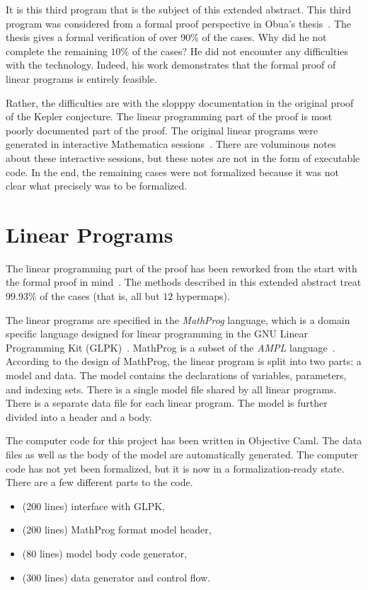 \documentclass{llncs}
\begin{document}
It is this third program
that is the subject of this extended abstract.  This third
program was considered from a formal proof
perspective in Obua's thesis~\cite{obua:phd}.
The thesis gives a formal verification of over 90\% of the cases.
Why did he not complete the remaining $10\%$ of the cases? He did not
encounter any difficulties with the technology.  Indeed, his work demonstrates
that the formal proof of linear programs is entirely feasible.

Rather, the difficulties are with the slopppy documentation in the
original proof of the Kepler conjecture.  The linear programming part
of the proof is most poorly documented part of the proof.  The
original linear programs were generated in interactive Mathematica
sessions~\cite{website:HalesKepler}.  There are voluminous notes about these interactive sessions,
but these notes are not in the form of executable code.  In the end, the remaining cases were not formalized because it was not clear what precisely was to be formalized.


\section{Linear Programs}

The linear programming part of the proof has been reworked from the
start with the formal proof in mind~\cite{website:FlyspeckProject}. The methods described in this extended
abstract treat 99.93\% of the cases (that is, all but $12$ hypermaps).

The linear programs are specified in the {\it MathProg} language,
which is a domain specific language designed for linear programming in the GNU Linear Programming Kit (GLPK)~\cite{website:GLPK}.
MathProg is a subset of the {\it AMPL} language~\cite{ampl}.  According to the
design of MathProg, the linear program is split into two parts: a
model and data.  The model contains the declarations of variables,
parameters, and indexing sets.  There is a single model file shared by
all linear programs.  There is a separate data file for each linear
program.  The model is further divided into a header and a body.

The computer code for this project has been written in Objective Caml.
The data files as well as the body of the model are automatically
generated.  The computer code has not yet been formalized, but it is now
in a formalization-ready state.  There are a few different parts to the code.

\begin{itemize}
\item (200 lines) interface with GLPK,
\item (200 lines) MathProg format model header,
\item (80 lines) model body code generator,
\item (300 lines) data generator and control flow.
\end{itemize}
\end{document}
